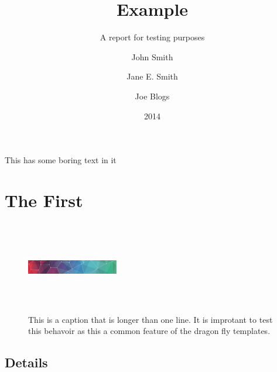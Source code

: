 \documentclass{aebr}
\title{Example}{An Example\\ Report about \emph{sheep} but that also has such
a long title that it actually has to wrap!}
\subtitle{A report for testing purposes}
\date{2014}
\author{John Smith \and Jane E. Smith \and Joe Blogs}
\begin{document}
\maketitle

\tableofcontents

\summary

\citeself

This has some boring text in it



\section{The First}

\lipsum[1]


\begin{figure}[h]
  \includegraphics[width=40mm,height=40mm]{pattern}
  \caption{This is a caption that is longer than one line. It is improtant to test 
  this behavoir as this a common feature of the dragon fly templates.}
\end{figure}

\subsection{Details}

\lipsum[2]
\end{document}
